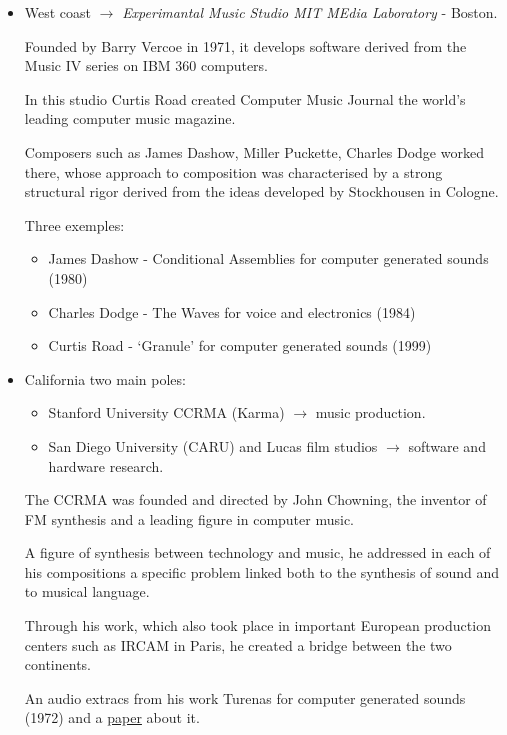 \begin{itemize}
\item West coast \(\rightarrow\) \textit{Experimantal Music Studio MIT MEdia
  Laboratory} - Boston.

  Founded by Barry Vercoe in 1971, it develops software derived from the Music IV series on IBM 360 computers.

  In this studio Curtis Road created Computer Music Journal the world's leading computer music magazine.

  Composers such as James Dashow, Miller Puckette, Charles Dodge worked there, whose approach to composition was characterised by a strong structural rigor derived from the ideas developed by Stockhousen in Cologne.

  Three exemples:

  \begin{itemize}
  \item James Dashow - Conditional Assemblies for computer generated sounds (1980)
  \item Charles Dodge - The Waves for voice and electronics (1984)
  \item Curtis Road - `Granule' for computer generated sounds (1999)
  \end{itemize}
\item California two main poles:

  \begin{itemize}
  \tightlist
  \item Stanford University CCRMA (Karma) \(\rightarrow\) music production.
  \item San Diego University (CARU) and Lucas film studios \(\rightarrow\) software and hardware research.
  \end{itemize}

  The CCRMA was founded and directed by John Chowning, the inventor of FM synthesis and a leading figure in computer music.

  A figure of synthesis between technology and music, he addressed in each of his compositions a specific problem linked both to the synthesis of sound and to musical language.

  Through his work, which also took place in important European production centers such as IRCAM in Paris, he created a bridge between the two continents.

  An audio extracs from his work Turenas for computer generated sounds (1972) and a \href{img/turenas.pdf}{paper} about it.
\end{itemize}

